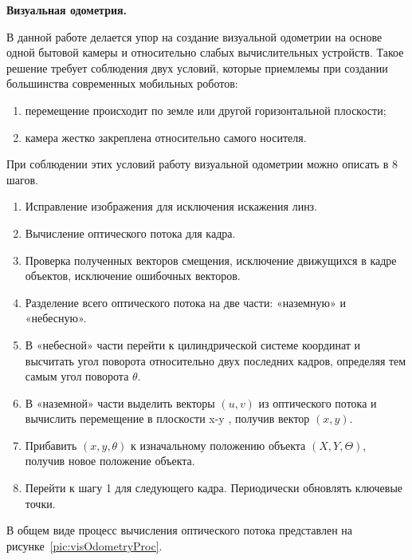 \textbf{Визуальная одометрия.}

В данной работе делается упор на создание визуальной одометрии на основе одной бытовой камеры и относительно слабых вычислительных устройств. Такое решение требует соблюдения двух условий, которые приемлемы при создании большинства современных мобильных роботов:
\begin{enumerate}
\item перемещение происходит по земле или другой горизонтальной плоскости;
\item камера жестко закреплена относительно самого носителя.
\end{enumerate}

При соблюдении этих условий работу визуальной одометрии можно описать в 8 шагов\cite{visaulOdometryMy}.
\begin{enumerate}
\item Исправление изображения для исключения искажения линз.
\item Вычисление оптического потока для кадра.
\item Проверка полученных векторов смещения, исключение движущихся в кадре объектов, исключение ошибочных векторов.
\item Разделение всего оптического потока на две части: «наземную» и «небесную».
\item В «небесной» части перейти к цилиндрической системе координат и высчитать угол поворота относительно двух последних кадров, определяя тем самым угол поворота $\theta$.
\item В «наземной» части выделить векторы $(u,v)$ из оптического потока  и вычислить перемещение в плоскости x-y , получив вектор $(x, y)$.
\item Прибавить $(x, y, \theta)$ к изначальному положению объекта $(X, Y, \Theta)$, получив новое положение объекта.
\item Перейти к шагу 1 для следующего кадра. Периодически обновлять ключевые точки.
\end{enumerate}
	
В общем виде процесс вычисления оптического потока представлен на рисунке~\ref{pic:visOdometryProc}.


